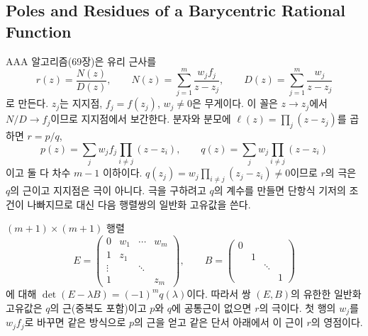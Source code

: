 \subsection{Poles and Residues of a Barycentric Rational Function}
\label{sec:aaa-poles}

AAA 알고리즘\cite{nakatsukasa2018aaa}(69장)은 유리 근사를 
\begin{equation}
\label{eq:bary}
r(z)=\frac{N(z)}{D(z)},\qquad N(z)=\sum_{j=1}^m\frac{w_jf_j}{z-z_j},\qquad D(z)=\sum_{j=1}^m\frac{w_j}{z-z_j}
\end{equation}
로 만든다. $z_j$는 지지점, $f_j=f(z_j)$, $w_j\ne0$은 무게이다. 이 꼴은 $z\to z_j$에서 $N/D\to f_j$이므로 지지점에서 보간한다. 분자와 분모에 $\ell(z)=\prod_j(z-z_j)$를 곱하면 $r=p/q$,
\[
p(z)=\sum_jw_jf_j\prod_{i\ne j}(z-z_i),\qquad q(z)=\sum_jw_j\prod_{i\ne j}(z-z_i)
\]
이고 둘 다 차수 $m-1$ 이하이다. $q(z_j)=w_j\prod_{i\ne j}(z_j-z_i)\ne0$이므로 $r$의 극은 $q$의 근이고 지지점은 극이 아니다. 극을 구하려고 $q$의 계수를 만들면 단항식 기저의 조건이 나빠지므로 대신 다음 행렬쌍의 일반화 고유값을 쓴다.

\begin{proposition}
\label{prop:arrowhead}
$(m+1)\times(m+1)$ 행렬
\[
E=\begin{pmatrix}0&w_1&\cdots&w_m\\1&z_1&&\\\vdots&&\ddots&\\1&&&z_m\end{pmatrix},\qquad B=\begin{pmatrix}0&&&\\&1&&\\&&\ddots&\\&&&1\end{pmatrix}
\]
에 대해 $\det(E-\lambda B)=(-1)^mq(\lambda)$이다. 따라서 쌍 $(E,B)$의 유한한 일반화 고유값은 $q$의 근(중복도 포함)이고 $p$와 $q$에 공통근이 없으면 $r$의 극이다. 첫 행의 $w_j$를 $w_jf_j$로 바꾸면 같은 방식으로 $p$의 근을 얻고 같은 단서 아래에서 이 근이 $r$의 영점이다.
\end{proposition}

